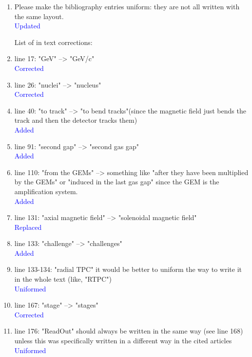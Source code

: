 \documentclass[a4paper,11pt,twoside]{article}
\begin{document}
\begin{enumerate}
\item Please make the bibliography entries uniform: they are not all written 
   with the same layout.\\
\textcolor{blue}{Updated} 

List of in text corrections:

\item line 17: "GeV" --> "GeV/c"\\
\textcolor{blue}{Corrected} 

\item line 26: "nuclei" --> "nucleus"\\
\textcolor{blue}{Corrected} 

\item line 40: "to track" --> "to bend tracks"(since the magnetic field just 
   bends the track and then the detector tracks them)\\
\textcolor{blue}{Added} 

\item line 91: "second gap" --> "second gas gap"\\
\textcolor{blue}{Added} 

\item line 110: "from the GEMs" -->  something like "after they have been 
   multiplied by the GEMs" or "induced in the last gas gap" since the GEM is 
   the amplification system.\\
\textcolor{blue}{Added} 

\item line 131: "axial magnetic field" --> "solenoidal magnetic field"\\
\textcolor{blue}{Replaced} 

\item line 133: "challenge" --> "challenges"\\
\textcolor{blue}{Added} 

\item line 133-134: "radial TPC" it would be better to uniform the way to write 
   it in the whole text (like, "RTPC")\\
\textcolor{blue}{Uniformed} 

\item line 167: "stage" --> "stages"\\
\textcolor{blue}{Corrected} 

\item line 176: "ReadOut" should always be written in the same way (see line 
   168) unless this was specifically written in a different way in the cited 
   articles\\
\textcolor{blue}{Uniformed} 


\end{enumerate}
\end{document}
